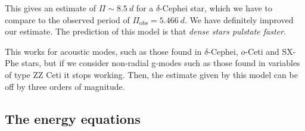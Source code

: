 \documentclass[main.tex]{subfiles}
\begin{document}
This gives an estimate of \(\Pi \sim \SI{8.5}{d}\) for a \(\delta \)-Cephei star, which we have to compare to the observed period of \(\Pi _{\text{obs}} = \SI{5.466}{d}\). We have definitely improved our estimate. 
The prediction of this model is that \emph{dense stars pulstate faster}. 

This works for acoustic modes, such as those found in \(\delta \)-Cephei, \(o\)-Ceti and SX-Phe stars, but if we consider non-radial g-modes such as those found in variables of type ZZ Ceti it stops working. Then, the estimate given by this model can be off by three orders of magnitude. 

\subsection{The energy equations}
\end{document}
